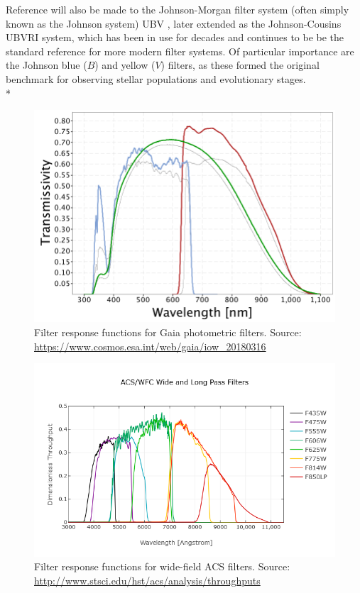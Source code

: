 \documentclass[12pt, a4paper]{report}
\begin{document}
Reference will also be made to the Johnson-Morgan filter system (often simply known as the Johnson system) UBV \cite{1953ApJ...117..313J}, later extended as the Johnson-Cousins UBVRI \cite{1990PASP..102.1181B} system, which has been in use for decades and continues to be be the standard reference for more modern filter systems. Of particular importance are the Johnson blue ($B$) and yellow ($V$) filters, as these formed the original benchmark for observing stellar populations and evolutionary stages. \\*

\begin{figure}[h]
\begin{center}
\includegraphics[scale=0.5]{GaiaDR2Passbands.png}
\caption{Filter response functions for Gaia photometric filters. Source: \protect\url{https://www.cosmos.esa.int/web/gaia/iow_20180316}}
\label{Gaia_response_funcs}
\end{center}
\end{figure}

\begin{figure}[h]
\begin{center}
\includegraphics[scale=0.5]{ACS_Wide.png}
\caption{Filter response functions for wide-field ACS filters. Source: \protect\url{http://www.stsci.edu/hst/acs/analysis/throughputs}}
\label{ACS_response_funcs}
\end{center}
\end{figure}
\end{document}
